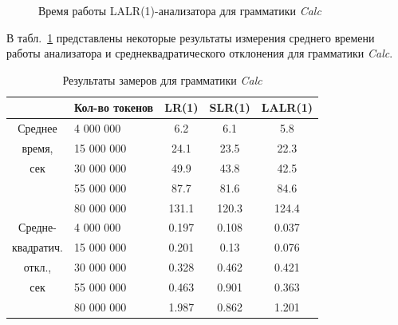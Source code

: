 \documentclass[14pt]{matmex-diploma}
\begin{document}
\begin{figure}[H]
  \caption{Время работы LALR(1)-анализатора для грамматики \textit{Calc}}
  \label{CalcLALR1}
  \centering
\end{figure}

В табл.~\ref{tab:Calc} представлены некоторые результаты измерения среднего времени работы анализатора и среднеквадратического отклонения для грамматики \textit{Calc}.

\begin{table}[h]
\begin{center}
\begin{tabular}{|c|l|c|c|c|}
\hline  
 & Кол-во токенов & LR(1) & SLR(1) & LALR(1) \\ 
\hline  
 Среднее & 4 000 000 &  6.2 & 6.1 & 5.8 \\  
\cline{2-5}
время, & 15 000 000 & 24.1 & 23.5 & 22.3 \\  
\cline{2-5}
сек & 30 000 000 & 49.9 & 43.8 & 42.5 \\
\cline{2-5}
 & 55 000 000 & 87.7 & 81.6 & 84.6 \\
\cline{2-5}
 & 80 000 000 & 131.1 & 120.3 & 124.4 \\
\hline
\hline
Средне- & 4 000 000 & 0.197 & 0.108 & 0.037 \\  
\cline{2-5}
квадратич. & 15 000 000 & 0.201 & 0.13 & 0.076 \\  
\cline{2-5}
откл., & 30 000 000 & 0.328 & 0.462 & 0.421 \\
\cline{2-5}
сек & 55 000 000 & 0.463 & 0.901 & 0.363 \\
\cline{2-5}
 & 80 000 000 & 1.987 & 0.862 & 1.201 \\               
\hline  
\end{tabular}
\end{center}
\caption{\label{tab:Calc} Результаты замеров для грамматики \textit{Calc}}
\end{table}
\end{document}
